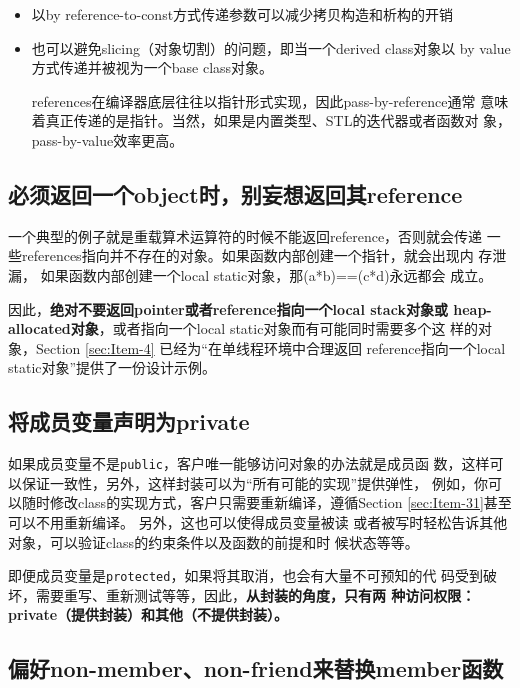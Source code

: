 \begin{itemize}
\item 以by reference-to-const方式传递参数可以减少拷贝构造和析构的开销
\item 也可以避免slicing（对象切割）的问题，即当一个derived class对象以
  by value方式传递并被视为一个base class对象。

  references在编译器底层往往以指针形式实现，因此pass-by-reference通常
  意味着真正传递的是指针。当然，如果是内置类型、STL的迭代器或者函数对
  象，pass-by-value效率更高。
\end{itemize}

\subsection{必须返回一个object时，别妄想返回其reference}
\label{sec:Item-21}

一个典型的例子就是重载算术运算符的时候不能返回reference，否则就会传递
一些references指向并不存在的对象。如果函数内部创建一个指针，就会出现内
存泄漏， 如果函数内部创建一个local static对象，那(a*b)==(c*d)永远都会
成立。

因此，\textbf{绝对不要返回pointer或者reference指向一个local stack对象或
heap-allocated对象}，或者指向一个local static对象而有可能同时需要多个这
样的对象，Section \ref{sec:Item-4} 已经为“在单线程环境中合理返回
reference指向一个local static对象”提供了一份设计示例。

\subsection{将成员变量声明为private}
\label{sec:Item-22}

如果成员变量不是\texttt{public}，客户唯一能够访问对象的办法就是成员函
数，这样可以保证一致性，另外，这样封装可以为“所有可能的实现”提供弹性，
例如，你可以随时修改class的实现方式，客户只需要重新编译，遵循Section
\ref{sec:Item-31}甚至可以不用重新编译。 另外，这也可以使得成员变量被读
或者被写时轻松告诉其他对象，可以验证class的约束条件以及函数的前提和时
候状态等等。

即便成员变量是\texttt{protected}，如果将其取消，也会有大量不可预知的代
码受到破坏，需要重写、重新测试等等，因此，\textbf{从封装的角度，只有两
  种访问权限：private（提供封装）和其他（不提供封装）。}

\subsection{偏好non-member、non-friend来替换member函数}
\label{sec:Item-23}

